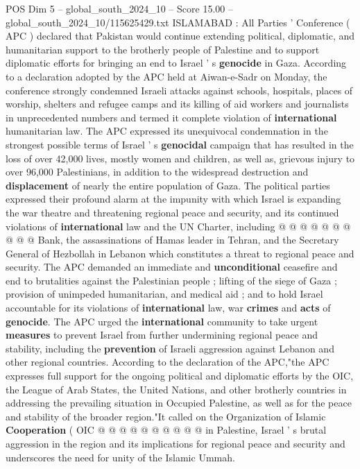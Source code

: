 \begin{textsample}{POS Dim 5 – global\_south\_2024\_10 – Score 15.00 – global\_south\_2024\_10/115625429.txt}  \label{ex:f5_pos_346}
ISLAMABAD : All Parties ' Conference ( APC ) declared that Pakistan would continue extending political, diplomatic, and humanitarian support to the brotherly people of Palestine and to support diplomatic efforts for bringing an end to Israel ' s \textbf{genocide} in Gaza.
According to a declaration adopted by the APC held at Aiwan-e-Sadr on Monday, the conference strongly condemned Israeli attacks against schools, hospitals, places of worship, shelters and refugee camps and its killing of aid workers and journalists in unprecedented numbers and termed it complete violation of \textbf{international} humanitarian law.
The APC expressed its unequivocal condemnation in the strongest possible terms of Israel ' s \textbf{genocidal} campaign that has resulted in the loss of over 42,000 lives, mostly women and children, as well as, grievous injury to over 96,000 Palestinians, in addition to the widespread destruction and \textbf{displacement} of nearly the entire population of Gaza.
The political parties expressed their profound alarm at the impunity with which Israel is expanding the war theatre and threatening regional peace and security, and its continued violations of \textbf{international} law and the UN Charter, including @ @ @ @ @ @ @ @ @ @ Bank, the assassinations of Hamas leader in Tehran, and the Secretary General of Hezbollah in Lebanon which constitutes a threat to regional peace and security.
The APC demanded an immediate and \textbf{unconditional} ceasefire and end to brutalities against the Palestinian people ; lifting of the siege of Gaza ; provision of unimpeded humanitarian, and medical aid ; and to hold Israel accountable for its violations of \textbf{international} law, war \textbf{crimes} and \textbf{acts} of \textbf{genocide}.
The APC urged the \textbf{international} community to take urgent \textbf{measures} to prevent Israel from further undermining regional peace and stability, including the \textbf{prevention} of Israeli aggression against Lebanon and other regional countries.
According to the declaration of the APC,"the APC expresses full support for the ongoing political and diplomatic efforts by the OIC, the League of Arab States, the United Nations, and other brotherly countries in addressing the prevailing situation in Occupied Palestine, as well as for the peace and stability of the broader region."It called on the Organization of Islamic \textbf{Cooperation} ( OIC @ @ @ @ @ @ @ @ @ @ in Palestine, Israel ' s brutal aggression in the region and its implications for regional peace and security and underscores the need for unity of the Islamic Ummah.

\end{textsample}
